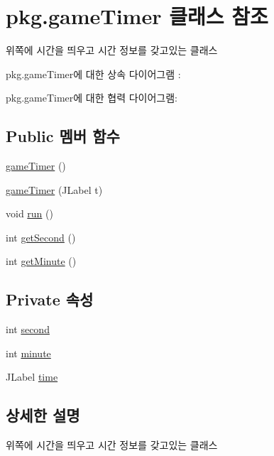 \hypertarget{classpkg_1_1game_timer}{}\section{pkg.\+game\+Timer 클래스 참조}
\label{classpkg_1_1game_timer}


위쪽에 시간을 띄우고 시간 정보를 갖고있는 클래스  




pkg.\+game\+Timer에 대한 상속 다이어그램 \+: 


pkg.\+game\+Timer에 대한 협력 다이어그램\+:
\subsection*{Public 멤버 함수}
\begin{DoxyCompactItemize}
\item 
\hyperlink{classpkg_1_1game_timer_a8cdd50788a7196c4b8ed3e186c7728c9}{game\+Timer} ()
\item 
\hyperlink{classpkg_1_1game_timer_a2db9c7f237de004229805f519c23b7e2}{game\+Timer} (J\+Label t)
\item 
void \hyperlink{classpkg_1_1game_timer_a211204d90baec9a6726c0e742e2fdffa}{run} ()
\item 
int \hyperlink{classpkg_1_1game_timer_ac9a650d8eaf327e8108cac67fbbfdfad}{get\+Second} ()
\item 
int \hyperlink{classpkg_1_1game_timer_af37924eb416037022e0063ae1be50e73}{get\+Minute} ()
\end{DoxyCompactItemize}
\subsection*{Private 속성}
\begin{DoxyCompactItemize}
\item 
int \hyperlink{classpkg_1_1game_timer_a06c42bbe6c9cacd4b94a0dcae1564208}{second}
\item 
int \hyperlink{classpkg_1_1game_timer_ad7da9d653901d69078509ea47694bcfa}{minute}
\item 
J\+Label \hyperlink{classpkg_1_1game_timer_adc15a552f72e3252db98b1589e04b614}{time}
\end{DoxyCompactItemize}


\subsection{상세한 설명}
위쪽에 시간을 띄우고 시간 정보를 갖고있는 클래스 

